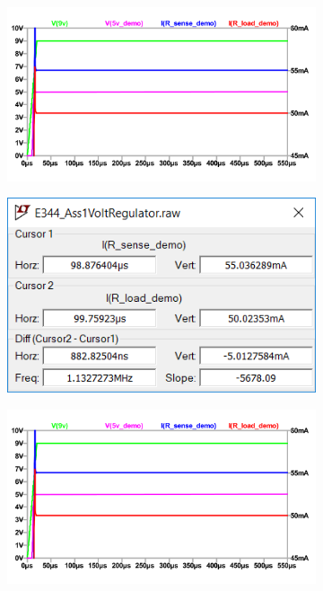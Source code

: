 \begin{figure}
 \footnotesize
 \centering
    \begin{subfigure}[]{0.55\textwidth}
              \centering
  		\includegraphics[width=1\linewidth]{./Figures/E344_VoltRegulator.pdf}
		    \caption{} \label{subfig:pwr_simu_rect}
     \end{subfigure}
     \begin{subfigure}[]{0.4\textwidth}
             \centering
  		\includegraphics[width=1.0\linewidth]{./Figures/Screengrab2}
		   \caption{ } \label{subfig:pwr_meas_rect}
     \end{subfigure}
    \begin{subfigure}[]{0.55\textwidth}
              \centering
  		\includegraphics[width=1\linewidth]{./Figures/E344_VoltRegulator.pdf}

\end{subfigure}
\end{figure}
